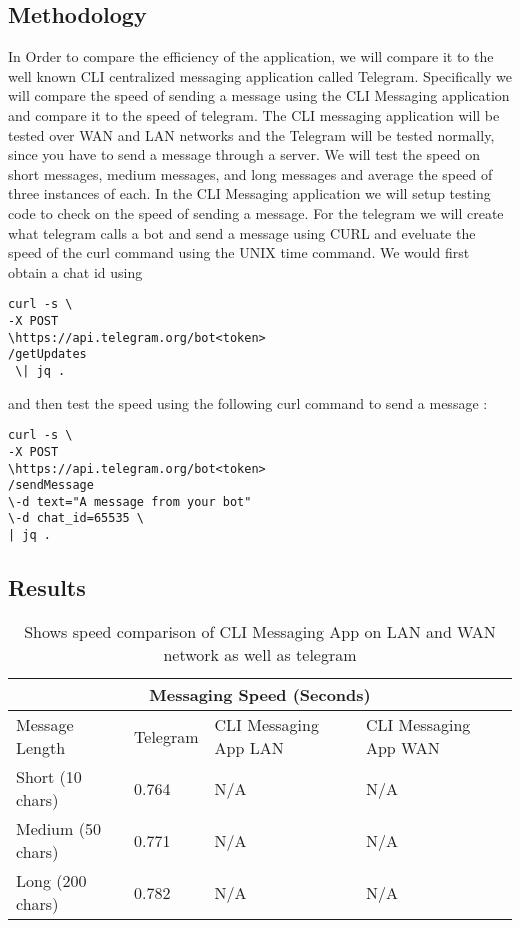 \documentclass[twoside]{article}
\begin{document}
\begin{multicols}{2}
\subsection{Methodology}
In Order to compare the efficiency of the application, we will compare it to the well known CLI centralized messaging application called Telegram. Specifically we will compare the speed of sending a message using the CLI Messaging application and compare it to the speed of telegram. The CLI messaging application will be tested over WAN and LAN networks and the Telegram will be tested normally, since you have to send a message through a server. We will test the speed on short messages, medium messages, and long messages and average the speed of three instances of each. In the CLI Messaging application we will setup testing code to check on the speed of sending a message. For the telegram we will create what telegram calls a bot and send a message using CURL and eveluate the speed of the curl command using the UNIX time command. We would first obtain a chat id using 
\begin{lstlisting}
curl -s \ 
-X POST 
\https://api.telegram.org/bot<token>
/getUpdates
 \| jq .
\end{lstlisting} 
and then test the speed using the following curl command to send a message \cite{malizia}: 
\begin{lstlisting}
curl -s \
-X POST 
\https://api.telegram.org/bot<token>
/sendMessage 
\-d text="A message from your bot" 
\-d chat_id=65535 \ 
| jq .
\end{lstlisting} 
\centering
\subsection{Results}
\begin{table*}[t]
\centering
\begin{tabular}{ |p{3cm}||p{3cm}|p{3cm}|p{3cm}|  }
 \hline
 \multicolumn{4}{|c|}{Messaging Speed (Seconds)} \\
 \hline
Message Length& Telegram &CLI Messaging App LAN &CLI Messaging App WAN \\
 \hline
 Short (10 chars)   &0.764&N/A&   N/A\\
 Medium (50 chars)&0.771  & N/A&   N/A\\
 Long (200 chars) &0.782 & N/A&  N/A\\
 \hline
\end{tabular}
\caption{ Shows speed comparison of CLI Messaging App on LAN and WAN network as well as telegram}
\end{table*}
\FloatBarrier


\end{multicols}
\end{document}

